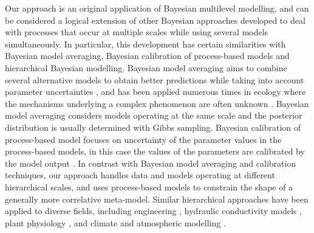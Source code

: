 Our approach is an original application of Bayesian multilevel modelling, and can be considered a logical extension of other Bayesian approaches developed to deal with processes that occur at multiple scales while using several models simultaneously. 
In particular, this development has certain similarities with Bayesian model averaging, Bayesian calibration of process-based models and hierarchical Bayesian modelling. 
Bayesian model averaging aims to combine several alternative models to obtain better predictions while taking into account parameter uncertainties \citep{Hoeting1999}, and has been applied numerous times in ecology where the mechanisms underlying a complex phenomenon are often unknown \citep[e.g.][]{Wintle2003, Link2006}. 
Bayesian model averaging considers models operating at the same scale and the posterior distribution is usually determined with Gibbs sampling. 
Bayesian calibration of process-based model focuses on uncertainty of the parameter values in the process-based models, in this case the values of the parameters are calibrated by the model output \citep{VanOijen2005, VanOijen2011}. 
In contrast with Bayesian model averaging and calibration techniques, our approach handles data and models operating at different hierarchical scales, and uses process-based models to constrain the shape of a generally more correlative meta-model.
Similar hierarchical approaches have been applied to diverse fields, including engineering \citep{Booth2013}, hydraulic conductivity models \citep{Dostert2009, Efendiev2005, Efendiev2005a}, plant physiology \citep{Ogle2008, Ogle2009}, and climate and atmospheric modelling \citep{Zimmerman2005, Mcmillan2010, Kang2012}.

